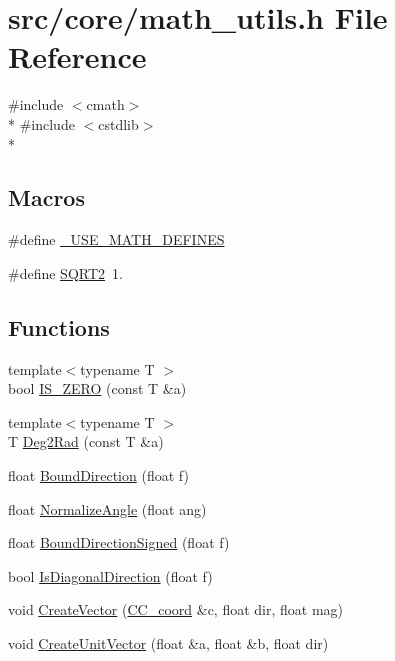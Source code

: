 \hypertarget{a00220}{\section{src/core/math\-\_\-utils.h File Reference}
\label{a00220}
}
{\ttfamily \#include $<$cmath$>$}\\*
{\ttfamily \#include $<$cstdlib$>$}\\*
\subsection*{Macros}
\begin{DoxyCompactItemize}
\item 
\#define \hyperlink{a00220_a525335710b53cb064ca56b936120431e}{\-\_\-\-U\-S\-E\-\_\-\-M\-A\-T\-H\-\_\-\-D\-E\-F\-I\-N\-E\-S}
\item 
\#define \hyperlink{a00220_a514396dd60fa0621c83072091fb2a0cd}{S\-Q\-R\-T2}~1.
\end{DoxyCompactItemize}
\subsection*{Functions}
\begin{DoxyCompactItemize}
\item 
{\footnotesize template$<$typename T $>$ }\\bool \hyperlink{a00220_a99666e6499669b05a8cdff8faaf3878e}{I\-S\-\_\-\-Z\-E\-R\-O} (const T \&a)
\item 
{\footnotesize template$<$typename T $>$ }\\T \hyperlink{a00220_a42e6c0f7de7015b07013962b88cfb84a}{Deg2\-Rad} (const T \&a)
\item 
float \hyperlink{a00220_a8de4d15d8fe0f9bb6b77a79fe70c3a0f}{Bound\-Direction} (float f)
\item 
float \hyperlink{a00220_ad38ca8535064a4237d1520b4d4a7b02f}{Normalize\-Angle} (float ang)
\item 
float \hyperlink{a00220_a1586ddb56dc59ae26381b6cda2e48121}{Bound\-Direction\-Signed} (float f)
\item 
bool \hyperlink{a00220_aac20f18810109b5fc4411e79f60b4709}{Is\-Diagonal\-Direction} (float f)
\item 
void \hyperlink{a00220_a13dd8bd63d1c19a47f72f0147782aa3f}{Create\-Vector} (\hyperlink{a00029}{C\-C\-\_\-coord} \&c, float dir, float mag)
\item 
void \hyperlink{a00220_a12be9b73b9dc3580491795559b3fd3ce}{Create\-Unit\-Vector} (float \&a, float \&b, float dir)
\end{DoxyCompactItemize}
